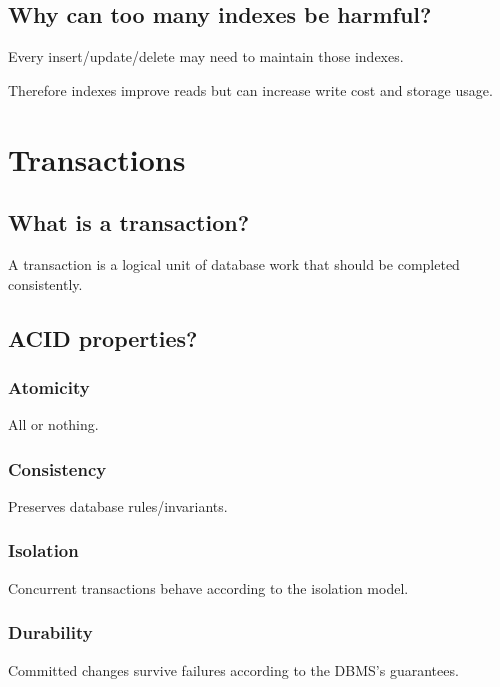 \subsection{Why can too many indexes be harmful?}

Every insert/update/delete may need to maintain those indexes.

Therefore indexes improve reads but can increase write cost and storage usage.

\medskip

\section{Transactions}

\subsection{What is a transaction?}

A transaction is a logical unit of database work that should be completed consistently.

\medskip

\subsection{ACID properties?}

\subsubsection{Atomicity}

All or nothing.

\subsubsection{Consistency}

Preserves database rules/invariants.

\subsubsection{Isolation}

Concurrent transactions behave according to the isolation model.

\subsubsection{Durability}

Committed changes survive failures according to the DBMS's guarantees.

